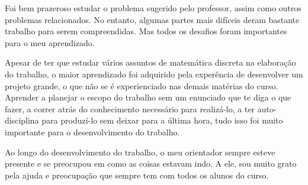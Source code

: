 \documentclass{article}
\begin{document}
Foi bem prazeroso estudar o problema sugerido pelo professor, assim como outros problemas relacionados. No entanto, algumas partes mais difíceis deram bastante trabalho para serem compreendidas. Mas todos os desafios foram importantes para o meu aprendizado.

Apesar de ter que estudar vários assuntos de matemática discreta na elaboração do trabalho, o maior aprendizado foi adquirido pela experência de desenvolver um projeto grande, o que não se é experienciado nas demais matérias do curso. Aprender a planejar o escopo do trabalho sem um enunciado que te diga o que fazer, a correr atrás do conhecimento necessário para realizá-lo, a ter auto-disciplina para produzí-lo sem deixar para a última hora, tudo isso foi muito importante para o desenvolvimento do trabalho.

Ao longo do desenvolvimento do trabalho, o meu orientador sempre esteve presente e se preocupou em como as coisas estavam indo. A ele, sou muito grato pela ajuda e preocupação que sempre tem com todos os alunos do curso.
\end{document}
